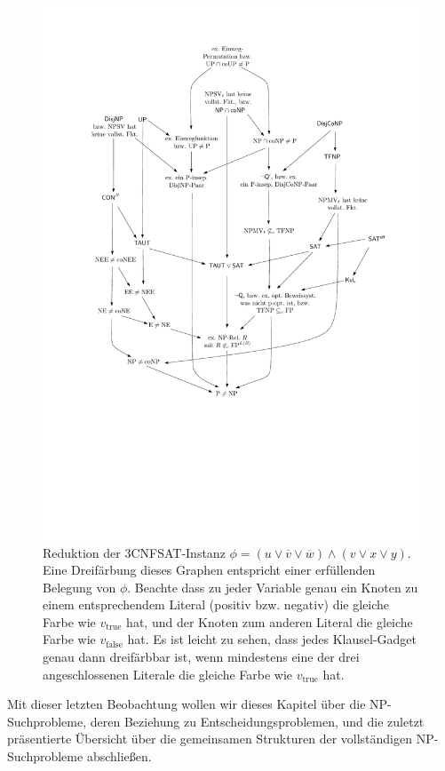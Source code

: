 \begin{figure}
    \sffamily
    \centering\includegraphics[page=6]{figures.pdf}
    \caption{Reduktion der 3CNFSAT-Instanz $\phi=(u\lor \overline{v} \lor \overline{w}) \land (v\lor x\lor y)$. 
        Eine Dreifärbung dieses Graphen entspricht einer erfüllenden Belegung von $\phi$.
    Beachte dass zu jeder Variable genau ein Knoten zu einem entsprechendem Literal (positiv bzw. negativ) die gleiche Farbe wie $v_{\text{true}}$ hat, und der Knoten zum anderen Literal die gleiche Farbe wie $v_{\text{false}}$ hat. Es ist leicht zu sehen, dass jedes Klausel-Gadget genau dann dreifärbbar ist, wenn mindestens eine der drei angeschlossenen Literale die gleiche Farbe wie $v_{\text{true}}$ hat.}\label{fig:3col}
\end{figure}

Mit dieser letzten Beobachtung wollen wir dieses Kapitel über die NP-Suchprobleme, deren Beziehung zu Entscheidungsproblemen, und die zuletzt präsentierte Übersicht über die gemeinsamen Strukturen der vollständigen NP-Suchprobleme abschließen. 


